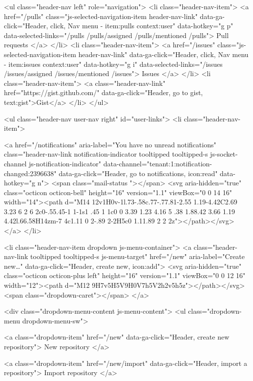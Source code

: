       <ul class="header-nav left" role="navigation">
        <li class="header-nav-item">
          <a href="/pulls" class="js-selected-navigation-item header-nav-link" data-ga-click="Header, click, Nav menu - item:pulls context:user" data-hotkey="g p" data-selected-links="/pulls /pulls/assigned /pulls/mentioned /pulls">
            Pull requests
</a>        </li>
        <li class="header-nav-item">
          <a href="/issues" class="js-selected-navigation-item header-nav-link" data-ga-click="Header, click, Nav menu - item:issues context:user" data-hotkey="g i" data-selected-links="/issues /issues/assigned /issues/mentioned /issues">
            Issues
</a>        </li>
          <li class="header-nav-item">
            <a class="header-nav-link" href="https://gist.github.com/" data-ga-click="Header, go to gist, text:gist">Gist</a>
          </li>
      </ul>

    
<ul class="header-nav user-nav right" id="user-links">
  <li class="header-nav-item">
    
    <a href="/notifications" aria-label="You have no unread notifications" class="header-nav-link notification-indicator tooltipped tooltipped-s js-socket-channel js-notification-indicator" data-channel="tenant:1:notification-changed:2396638" data-ga-click="Header, go to notifications, icon:read" data-hotkey="g n">
        <span class="mail-status "></span>
        <svg aria-hidden="true" class="octicon octicon-bell" height="16" version="1.1" viewBox="0 0 14 16" width="14"><path d="M14 12v1H0v-1l.73-.58c.77-.77.81-2.55 1.19-4.42C2.69 3.23 6 2 6 2c0-.55.45-1 1-1s1 .45 1 1c0 0 3.39 1.23 4.16 5 .38 1.88.42 3.66 1.19 4.42l.66.58H14zm-7 4c1.11 0 2-.89 2-2H5c0 1.11.89 2 2 2z"></path></svg>
</a>
  </li>

  <li class="header-nav-item dropdown js-menu-container">
    <a class="header-nav-link tooltipped tooltipped-s js-menu-target" href="/new"
       aria-label="Create new…"
       data-ga-click="Header, create new, icon:add">
      <svg aria-hidden="true" class="octicon octicon-plus left" height="16" version="1.1" viewBox="0 0 12 16" width="12"><path d="M12 9H7v5H5V9H0V7h5V2h2v5h5z"></path></svg>
      <span class="dropdown-caret"></span>
    </a>

    <div class="dropdown-menu-content js-menu-content">
      <ul class="dropdown-menu dropdown-menu-sw">
        
<a class="dropdown-item" href="/new" data-ga-click="Header, create new repository">
  New repository
</a>

  <a class="dropdown-item" href="/new/import" data-ga-click="Header, import a repository">
    Import repository
  </a>


